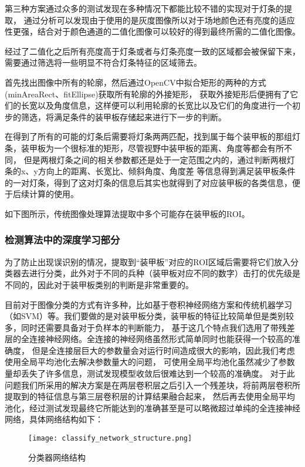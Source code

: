 第三种方案通过众多的测试发现在多种情况下都能比较不错的实现对于灯条的提取，
通过分析可以发现由于使用的是灰度图像所以对于场地颜色还有亮度的适应性更强，结合对于颜色通道的二值化图像可以较好的得到最终所需的二值化图像。\par

经过了二值化之后所有亮度高于灯条或者与灯条亮度一致的区域都会被保留下来，需要通过筛选将一些明显不符合灯条特征的区域筛去。\par

首先找出图像中所有的轮廓，然后通过OpenCV中拟合矩形的两种的方式(minAreaRect、fitEllipse)获取所有轮廓的外接矩形，
获取外接矩形后便拥有了它们的长宽以及角度信息，这样便可以利用轮廓的长宽比以及它们的角度进行一个初步的筛选，将满足条件的装甲板存储起来进行下一步的判断。\par

在得到了所有的可能的灯条后需要将灯条两两匹配，找到属于每个装甲板的那组灯条，装甲板为一个很标准的矩形，尽管视野中装甲板的距离、角度等都会有所不同，
但是两根灯条之间的相关参数都还是处于一定范围之内的，通过判断两根灯条的x、y方向上的距离、长宽比、倾斜角度、角度差
等信息得到满足装甲板条件的一对灯条，得到了这对灯条的信息后其实也就得到了对应装甲板的各类信息，便于后续计算的使用。\par
如下图所示，传统图像处理算法提取中多个可能存在装甲板的ROI。

\subsubsection{检测算法中的深度学习部分}

为了防止出现误识别的情况，提取到“装甲板”对应的ROI区域后需要将它们放入分类器去进行分类，此外对于不同的兵种（装甲板对应不同的数字）击打的优先级是不同的，因此对于装甲板类别的判断是非常重要的。\par
目前对于图像分类的方式有许多种，比如基于卷积神经网络方案和传统机器学习（如SVM）等。我们要做的是对装甲板分类，装甲板的特征比较简单但是类别较多，同时还需要具备对于负样本的判断能力，
基于这几个特点我们选用了带残差层的全连接神经网络。全连接的神经网络虽然形式简单同时也能获得一个较高的准确度，
但是全连接层巨大的参数量会对运行时间造成很大的影响，因此我们考虑使用全局平均池化去解决参数量大的问题，
可使用全局平均池化虽然减少了参数量却丢失了许多信息，测试发现模型收敛后很难达到一个较高的准确度。
对于此问题我们所采用的解决方案是在两层卷积层之后引入一个残差块，将前两层卷积所提取到的特征信息与第三层卷积层的计算结果融合起来，
然后再去使用全局平均池化，经过测试发现最终它所能达到的准确甚至是可以略微超过单纯的全连接神经网络，具体网络结构如下：\par
\begin{figure}[H]
    \centering
    \texttt{[image: classify\_network\_structure.png]} 
    \caption{分类器网络结构} 
\end{figure}

